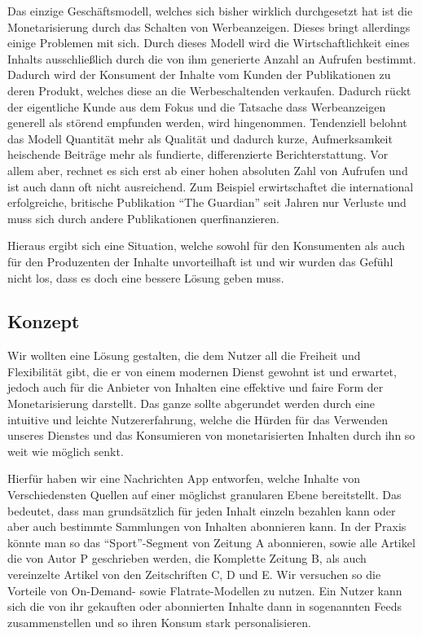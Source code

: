 Das einzige Geschäftsmodell, welches sich bisher wirklich durchgesetzt hat ist die Monetarisierung durch das Schalten von Werbeanzeigen. Dieses bringt allerdings einige Problemen mit sich. Durch dieses Modell wird die Wirtschaftlichkeit eines Inhalts ausschließlich durch die von ihm generierte Anzahl an Aufrufen bestimmt. Dadurch wird der Konsument der Inhalte vom Kunden der Publikationen zu deren Produkt, welches diese an die Werbeschaltenden verkaufen. Dadurch rückt der eigentliche Kunde aus dem Fokus und die Tatsache dass Werbeanzeigen generell als störend empfunden werden, wird hingenommen. Tendenziell belohnt das Modell Quantität mehr als Qualität und dadurch kurze, Aufmerksamkeit heischende Beiträge mehr als fundierte, differenzierte Berichterstattung. Vor allem aber, rechnet es sich erst ab einer hohen absoluten Zahl von Aufrufen und ist auch dann oft nicht ausreichend. Zum Beispiel erwirtschaftet die international erfolgreiche, britische Publikation \enquote{The Guardian} seit Jahren nur Verluste und muss sich durch andere Publikationen querfinanzieren.

Hieraus ergibt sich eine Situation, welche sowohl für den Konsumenten als auch für den Produzenten der Inhalte unvorteilhaft ist und wir wurden das Gefühl nicht los, dass es doch eine bessere Lösung geben muss.

\subsection{Konzept}

Wir wollten eine Lösung gestalten, die dem Nutzer all die Freiheit und Flexibilität gibt, die er von einem modernen Dienst gewohnt ist und erwartet, jedoch auch für die Anbieter von Inhalten eine effektive und faire Form der Monetarisierung darstellt. Das ganze sollte abgerundet werden durch eine intuitive und leichte Nutzererfahrung, welche die Hürden für das Verwenden unseres Dienstes und das Konsumieren von monetarisierten Inhalten durch ihn so weit wie möglich senkt.

Hierfür haben wir eine Nachrichten App entworfen, welche Inhalte von Verschiedensten Quellen auf einer möglichst granularen Ebene bereitstellt. Das bedeutet, dass man grundsätzlich für jeden Inhalt einzeln bezahlen kann oder aber auch bestimmte Sammlungen von Inhalten abonnieren kann. In der Praxis könnte man so das “Sport”-Segment von Zeitung A abonnieren, sowie alle Artikel die von Autor P geschrieben werden, die Komplette Zeitung B, als auch vereinzelte Artikel von den Zeitschriften C, D und E. Wir versuchen so die Vorteile von On-Demand- sowie Flatrate-Modellen zu nutzen. Ein Nutzer kann sich die von ihr gekauften oder abonnierten Inhalte dann in sogenannten Feeds zusammenstellen und so ihren Konsum stark personalisieren.

